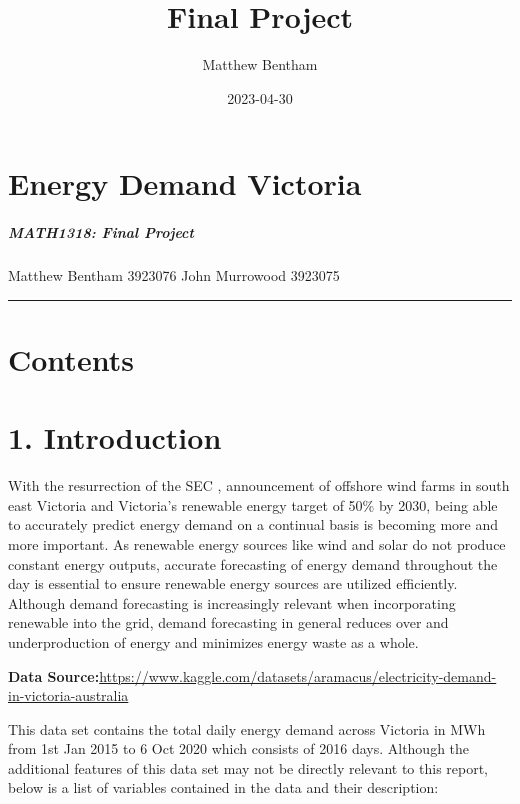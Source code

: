 \documentclass[
]{article}
\title{Final Project}
\author{Matthew Bentham}
\date{2023-04-30}
\begin{document}
\maketitle

\hypertarget{energy-demand-victoria}{%
\section{Energy Demand Victoria}\label{energy-demand-victoria}}

\hypertarget{math1318-final-project}{%
\subparagraph{\texorpdfstring{MATH1318: Final Project
\n\n}{MATH1318: Final Project }}\label{math1318-final-project}}

Matthew Bentham 3923076 \n John Murrowood 3923075 \n

\begin{center}\rule{0.5\linewidth}{0.5pt}\end{center}

\hypertarget{contents}{%
\section{Contents}\label{contents}}

\hypertarget{introduction}{%
\section{1. Introduction}\label{introduction}}

With the resurrection of the SEC , announcement of offshore wind farms
in south east Victoria and Victoria's renewable energy target of 50\% by
2030, being able to accurately predict energy demand on a continual
basis is becoming more and more important. As renewable energy sources
like wind and solar do not produce constant energy outputs, accurate
forecasting of energy demand throughout the day is essential to ensure
renewable energy sources are utilized efficiently. Although demand
forecasting is increasingly relevant when incorporating renewable into
the grid, demand forecasting in general reduces over and underproduction
of energy and minimizes energy waste as a whole.

\textbf{Data
Source:}\url{https://www.kaggle.com/datasets/aramacus/electricity-demand-in-victoria-australia}

This data set contains the total daily energy demand across Victoria in
MWh from 1st Jan 2015 to 6 Oct 2020 which consists of 2016 days.
Although the additional features of this data set may not be directly
relevant to this report, below is a list of variables contained in the
data and their description:
\end{document}
